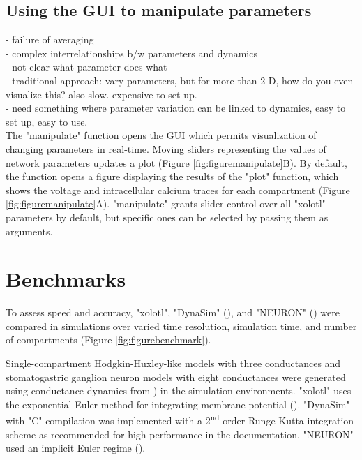\documentclass{frontiersSCNS} %
\begin{document}
%
%
%
%
%
%

\subsection{Using the GUI to manipulate parameters}


- failure of averaging \\
- complex interrelationships b/w parameters and dynamics\\
- not clear what parameter does what\\
- traditional approach: vary parameters, but for more than 2 D, how do you even visualize this? also slow. expensive to set up. \\
- need something where parameter variation can be linked to dynamics, easy to set up, easy to use. \\

The "manipulate" function opens the GUI which permits visualization of changing parameters in real-time. Moving sliders representing the values of network parameters updates a plot (Figure \ref{fig:figuremanipulate}B). By default, the function opens a figure displaying the results of the "plot" function, which shows the voltage and intracellular calcium traces for each compartment (Figure \ref{fig:figuremanipulate}A). "manipulate" grants slider control over all "xolotl" parameters by default, but specific ones can be selected by passing them as arguments.




%
%
%
%
%
%

\section{Benchmarks}
\label{benchmarks}

To assess speed and accuracy, "xolotl", "DynaSim" (\cite{sherfeyDynaSimMATLABToolbox2018}), and "NEURON" (\cite{hinesNEURONSimulationEnvironment1997}) were compared in simulations over varied time resolution,  simulation time, and number of compartments (Figure \ref{fig:figurebenchmark}).

Single-compartment Hodgkin-Huxley-like models with three conductances and stomatogastric ganglion neuron models with eight conductances were generated using conductance dynamics from \cite{liuModelNeuronActivityDependent1998}) in the simulation environments. "xolotl" uses the exponential Euler method for integrating membrane potential (\cite{dayanTheoreticalNeuroscience2001}). "DynaSim" with "C"-compilation was implemented with a 2\textsuperscript{nd}-order Runge-Kutta integration scheme as recommended for high-performance in the documentation. "NEURON" used an implicit Euler regime (\cite{hinesNEURONSimulationEnvironment1997}).
\end{document}
